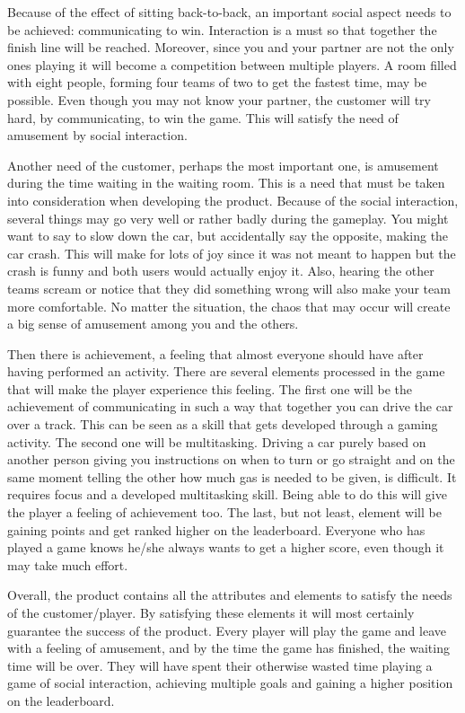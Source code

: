 \documentclass[11pt,twoside,a4paper]{article}
\begin{document}
Because of the effect of sitting back-to-back, an important social aspect needs to be achieved: communicating to win. Interaction is a must so that together the finish line will be reached. Moreover, since you and your partner are not the only ones playing it will become a competition between multiple players. A room filled with eight people, forming four teams of two to get the fastest time, may be possible. Even though you may not know your partner, the customer will try hard, by communicating, to win the game. This will satisfy the need of amusement by social interaction.

Another need of the customer, perhaps the most important one, is amusement during the time waiting in the waiting room. This is a need that must be taken into consideration when developing the product. Because of the social interaction, several things may go very well or rather badly during the gameplay. You might want to say to slow down the car, but accidentally say the opposite, making the car crash. This will make for lots of joy since it was not meant to happen but the crash is funny and both users would actually enjoy it. Also, hearing the other teams scream or notice that they did something wrong will also make your team more comfortable. No matter the situation, the chaos that may occur will create a big sense of amusement among you and the others.

Then there is achievement, a feeling that almost everyone should have after having performed an activity. There are several elements processed in the game that will make the player experience this feeling. The first one will be the achievement of communicating in such a way that together you can drive the car over a track. This can be seen as a skill that gets developed through a gaming activity. The second one will be multitasking. Driving a car purely based on another person giving you instructions on when to turn or go straight and on the same moment telling the other how much gas is needed to be given, is difficult. It requires focus and a developed multitasking skill. Being able to do this will give the player a feeling of achievement too. The last, but not least, element will be gaining points and get ranked higher on the leaderboard. Everyone who has played a game knows he/she always wants to get a higher score, even though it may take much effort.

Overall, the product contains all the attributes and elements to satisfy the needs of the customer/player. By satisfying these elements it will most certainly guarantee the success of the product. Every player will play the game and leave with a feeling of amusement, and by the time the game has finished, the waiting time will be over. They will have spent their otherwise wasted time playing a game of social interaction, achieving multiple goals and gaining a higher position on the leaderboard.
\end{document}
